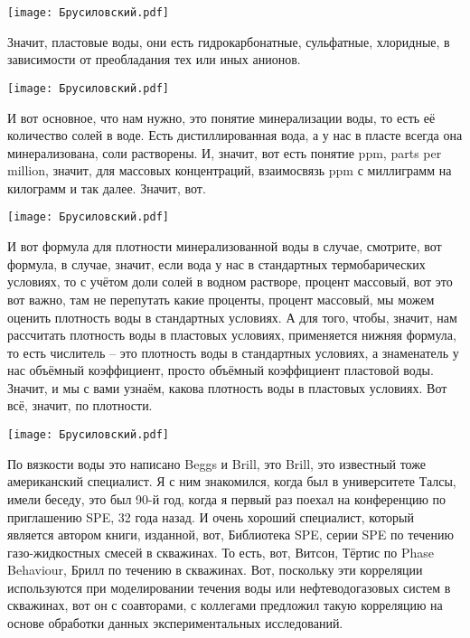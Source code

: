 \documentclass[main.tex]{subfiles}
\begin{document}
\begin{center}
\texttt{[image: Брусиловский.pdf]}
\end{center}

Значит, пластовые воды, они есть гидрокарбонатные, сульфатные, хлоридные, в зависимости от преобладания тех или иных анионов.

\begin{center}
\texttt{[image: Брусиловский.pdf]}
\end{center}

И вот основное, что нам нужно, это понятие минерализации воды, то есть её количество солей в воде.
Есть дистиллированная вода, а у нас в пласте всегда она минерализована, соли растворены.
И, значит, вот есть понятие ppm, parts per million, значит, для массовых концентраций, взаимосвязь ppm с миллиграмм на килограмм и так далее.
Значит, вот.

\begin{center}
\texttt{[image: Брусиловский.pdf]}
\end{center}

И вот формула для плотности минерализованной воды в случае, смотрите, вот формула, в случае, значит, если вода у нас в стандартных термобарических условиях, то с учётом доли солей в водном растворе, процент массовый, вот это вот важно, там не перепутать какие проценты, процент массовый, мы можем оценить плотность воды в стандартных условиях.
А для того, чтобы, значит, нам рассчитать плотность воды в пластовых условиях, применяется нижняя формула, то есть числитель – это плотность воды в стандартных условиях, а знаменатель у нас объёмный коэффициент, просто объёмный коэффициент пластовой воды.
Значит, и мы с вами узнаём, какова плотность воды в пластовых условиях.
Вот всё, значит, по плотности.

\begin{center}
\texttt{[image: Брусиловский.pdf]}
\end{center}

По вязкости воды это написано Beggs и Brill, это Brill, это известный тоже американский специалист.
Я с ним знакомился, когда был в университете Талсы, имели беседу, это был 90-й год, когда я первый раз поехал на конференцию по приглашению SPE, 32 года назад.
И очень хороший специалист, который является автором книги, изданной, вот, Библиотека SPE, серии SPE по течению газо-жидкостных смесей в скважинах.
То есть, вот, Витсон, Тёртис по Phase Behaviour, Брилл по течению в скважинах.
Вот, поскольку эти корреляции используются при моделировании течения воды или нефтеводогазовых систем в скважинах, вот он с соавторами, с коллегами предложил такую корреляцию на основе обработки данных экспериментальных исследований.
\end{document}
